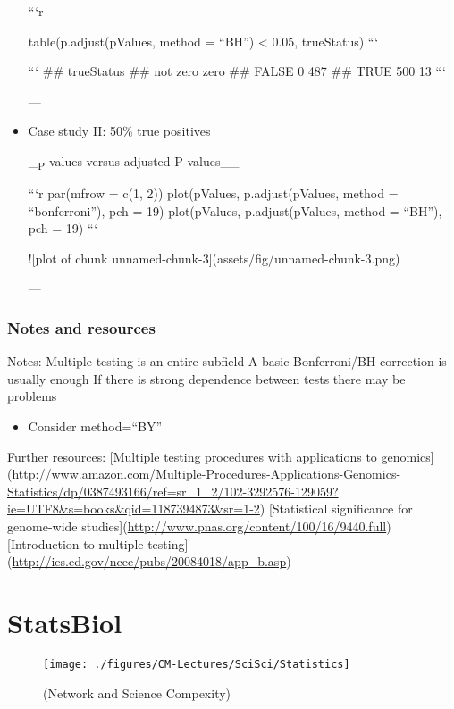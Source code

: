 \documentclass[10pt,article]{article}
\begin{document}
\begin{itemize}
```r

table(p.adjust(pValues, method = ``BH'') < 0.05, trueStatus)
```

```
\#\#        trueStatus
\#\#         not zero zero
\#\#   FALSE        0  487
\#\#   TRUE       500   13
```



---

\item Case study II: 50\% true positives
\label{sec:org5919ea3}

\_\textsubscript{P}-values versus adjusted P-values\_\_

```r
par(mfrow = c(1, 2))
plot(pValues, p.adjust(pValues, method = ``bonferroni''), pch = 19)
plot(pValues, p.adjust(pValues, method = ``BH''), pch = 19)
```

![plot of chunk unnamed-chunk-3](assets/fig/unnamed-chunk-3.png)



---
\end{itemize}

\subsubsection{Notes and resources}
\label{sec:org8421024}

Notes:
 Multiple testing is an entire subfield
 A basic Bonferroni/BH correction is usually enough
 If there is strong dependence between tests there may be problems
\begin{itemize}
\item Consider method=``BY''
\end{itemize}

Further resources:
 [Multiple testing procedures with applications to genomics](\url{http://www.amazon.com/Multiple-Procedures-Applications-Genomics-Statistics/dp/0387493166/ref=sr\_1\_2/102-3292576-129059?ie=UTF8\&s=books\&qid=1187394873\&sr=1-2})
 [Statistical significance for genome-wide studies](\url{http://www.pnas.org/content/100/16/9440.full})
 [Introduction to multiple testing](\url{http://ies.ed.gov/ncee/pubs/20084018/app\_b.asp})

\section{StatsBiol}
\label{sec:orgb24c718}

\begin{figure}[htp] \centering
  \texttt{[image: ./figures/CM-Lectures/SciSci/Statistics]} \caption{ (Network and Science Compexity)}
  \end{figure}
\end{document}
